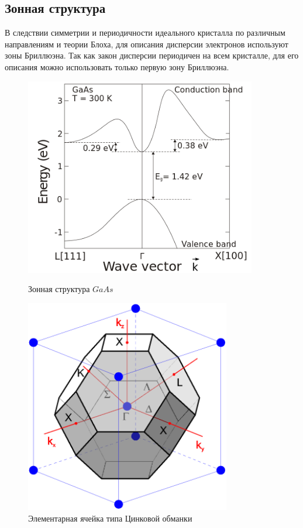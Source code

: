 \subsection{Зонная структура}
В следствии симметрии и периодичности идеального кристалла по различным направлениям и теории Блоха, для описания дисперсии электронов используют зоны Бриллюэна. Так как закон дисперсии периодичен на всем кристалле, для его описания можно использовать только первую зону Бриллюэна. 
\begin{figure}[h]
    \begin{minipage}[b]{0.5\textwidth}
		\centering
	    \includegraphics[width=0.9\textwidth]{assets/GaAs_E}
	    \caption{Зонная структура $GaAs$}
	\end{minipage}
	\hfill
	\begin{minipage}[b]{0.45\textwidth}
		\centering
		\includegraphics[width=0.8\textwidth]{assets/ZnLaer}
	    \caption{Элементарная ячейка типа Цинковой обманки}
	\end{minipage}
\end{figure}

